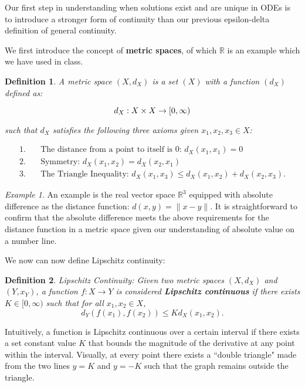 \documentclass{article}
\newtheorem{definition}{Definition}
\theoremstyle{remark}
\newtheorem{example}{Example}
\begin{document}
Our first step in understanding when solutions exist and are unique in ODEs is to introduce a stronger form of continuity than our previous epsilon-delta definition of general continuity.

We first introduce the concept of \textbf{metric spaces}, of which $\mathbb{R}$ is an example which we have used in class. \\

\begin{definition}
 A metric space $(X, d_X)$ is a set $(X)$ with a function $(d_X)$ defined as:

$$d_X: X \times X \to \Bbb [0, \infty )$$

such that $d_X$ satisfies the following three axioms given $x_1, x_2, x_3 \in X$:

\end{definition}
\begin{align*}
1.& \quad \text{The distance from a point to itself is 0: }d_X(x_1, x_1) = 0 \\ 
2.& \quad \text{Symmetry: } d_X(x_1, x_2) = d_X(x_2, x_1)\\
3.& \quad \text{The Triangle Inequality: }d_X(x_1, x_3) \leq  d_X(x_1, x_2) + d_X(x_2, x_3).
\end{align*}
\begin{example}
An example is the real vector space $\mathbb{R}^3$ equipped with absolute difference as the distance function: $d(x,y) = \|x-y\|$. It is straightforward to confirm that the absolute difference meets the above requirements for the distance function in a metric space given our understanding of absolute value on a number line.
\end{example}

We now can now define Lipschitz continuity: \\ 

\begin{definition} 
Lipschitz Continuity: Given two metric spaces $(X, d_X)$ and $(Y, x_Y)$, a function $f: X \to Y$ is considered \textbf{Lipschitz continuous} if there exists $K \in [0, \infty)$ such that for all $x_1, x_2 \in X$,
$$d_Y(f(x_1),f(x_2)) \leq Kd_X(x_1,x_2).$$
\end{definition} 

Intuitively, a function is Lipschitz continuous over a certain interval if there exists a set constant value $K$ that bounds the magnitude of the derivative at any point within the interval. Visually, at every point there exists a ``double triangle" made from the two lines $y = K$ and $y = -K$ such that  the graph remains outside the triangle.\\
\end{document}
